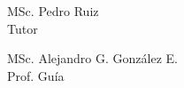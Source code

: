 \documentclass[paper=letter,oneside,fontsize=12pt, parskip=full]{article}
\begin{document}
	\vfill

	\begin{minipage}{0.2\textwidth}
		\centering 
		\large
		MSc. Pedro Ruiz \\
		\small
		Tutor
	\end{minipage}%
	\hfill 
	\begin{minipage}{0.4\textwidth}
		\centering \large
		MSc. Alejandro G. González E.	\\	
		\small
		Prof. Guía
	\end{minipage}
	\\
	\vfill
\end{document}
